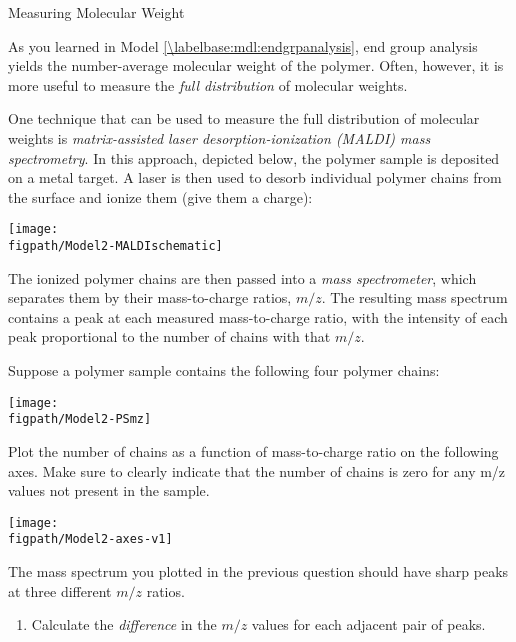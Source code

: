 \begin{activity}{Measuring Molecular Weight}
\begin{ctqs}
\end{ctqs}



\begin{model}
	\label{\labelbase:mdl:MALDI}

	As you learned in Model \ref{\labelbase:mdl:endgrpanalysis}, end group analysis yields the number-average molecular weight of the polymer.  Often, however, it is more useful to measure the \emph{full distribution} of molecular weights.
	
	One technique that can be used to measure the full distribution of molecular weights is \emph{matrix-assisted laser desorption-ionization (MALDI) mass spectrometry}.  In this approach, depicted below, the polymer sample is deposited on a metal target.  A laser is then used to desorb individual polymer chains from the surface and ionize them (give them a charge):   
	
	\vspace{12pt}
	\centerline{\texttt{[image: \\figpath/Model2-MALDIschematic]}}
	
	The ionized polymer chains are then passed into a \emph{mass spectrometer}, which separates them by their mass-to-charge ratios, $m/z$.  The resulting mass spectrum contains a peak at each measured mass-to-charge ratio, with the intensity of each peak proportional to the number of chains with that $m/z$. 

\end{model}

\begin{ctqs}

	\question Suppose a polymer sample contains the following four polymer chains: \label{\labelbase:ctq:PS-MALDI}
	
			\centerline{\texttt{[image: \\figpath/Model2-PSmz]}}
	
		Plot the number of chains as a function of mass-to-charge ratio on the following axes.  Make sure to clearly indicate that the number of chains is zero for any m/z values not present in the sample.
		
			\vspace{12pt}
			\centerline{\texttt{[image: \\figpath/Model2-axes-v1]}}
			
	\clearpage
	\question The mass spectrum you plotted in the previous question should have sharp peaks at three different $m/z$ ratios.
	
		\begin{enumerate}
			\item Calculate the \emph{difference} in the $m/z$ values for each adjacent pair of peaks.
			

\end{enumerate}
\end{ctqs}
\end{activity}
